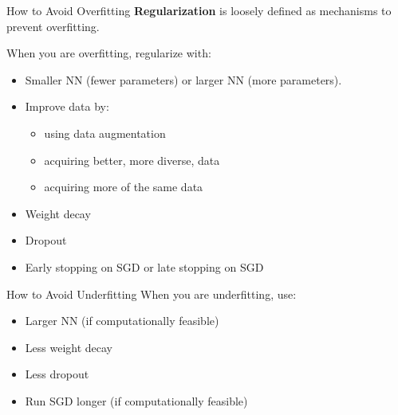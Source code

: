 \begin{frame}[allowframebreaks]

\begin{myconceptblock}{6.6}{How to Avoid Overfitting}
    \textbf{Regularization} is loosely defined as mechanisms to prevent overfitting.

    When you are overfitting, regularize with:

    \begin{itemize}
        \item Smaller NN (fewer parameters) or larger NN (more parameters).
        \item
        Improve data by:

        \begin{itemize}
            \item using data augmentation
            \item acquiring better, more diverse, data
            \item acquiring more of the same data
        \end{itemize}
        \item Weight decay
        \item Dropout
        \item Early stopping on SGD or late stopping on SGD
    \end{itemize}
\end{myconceptblock}

\end{frame}

\begin{frame}[allowframebreaks]

\begin{myconceptblock}{6.7}{How to Avoid Underfitting}
    When you are underfitting, use:

    \begin{itemize}
        \item Larger NN (if computationally feasible)
        \item Less weight decay
        \item Less dropout
        \item Run SGD longer (if computationally feasible)
    \end{itemize}
\end{myconceptblock}

\end{frame}

